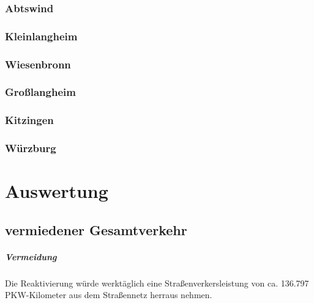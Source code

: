 \documentclass[fontsize=12pt,a4paper]{scrreprt}
\begin{document}
                \subsection{Abtswind}
                
                
                \subsection{Kleinlangheim}
                
                
                \subsection{Wiesenbronn}
                
                
                \subsection{Großlangheim}
                
                
                \subsection{Kitzingen}
                
                
                \subsection{Würzburg}
                

    \chapter{Auswertung}
        \section{vermiedener Gesamtverkehr}


                \paragraph{Vermeidung}
Die Reaktivierung würde werktäglich eine Straßenverkersleistung von ca. 136.797 PKW-Kilometer aus dem Straßennetz herraus nehmen.
\end{document}
